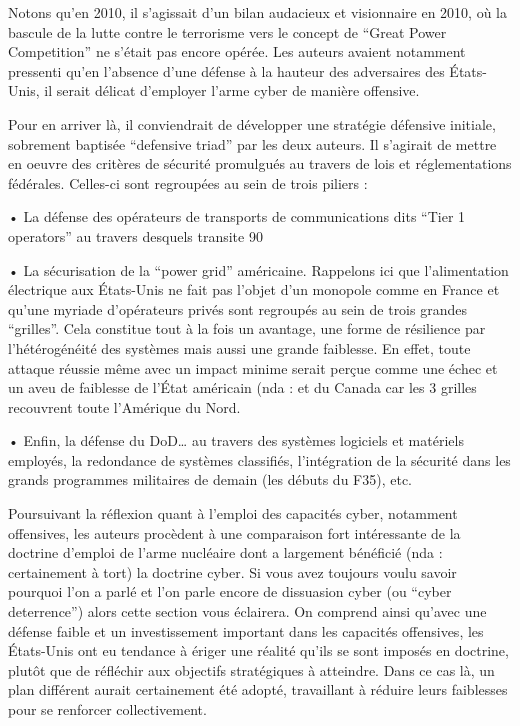 Notons qu’en 2010, il s’agissait d’un bilan audacieux et visionnaire en 2010, où la bascule de la lutte contre le terrorisme vers le concept de “Great Power Competition” ne s’était pas encore opérée. Les auteurs avaient notamment pressenti qu’en l’absence d’une défense à la hauteur des adversaires des États-Unis, il serait délicat d’employer l’arme cyber de manière offensive. 

Pour en arriver là, il conviendrait de développer une stratégie défensive initiale, sobrement baptisée “defensive triad” par les deux auteurs. Il s’agirait de mettre en oeuvre des critères de sécurité promulgués au travers de lois et réglementations fédérales. Celles-ci sont regroupées au sein de trois piliers :

•               La défense des opérateurs de transports de communications dits “Tier 1 operators” au travers desquels transite 90 %

•               La sécurisation de la “power grid” américaine. Rappelons ici que l’alimentation électrique aux États-Unis ne fait pas l’objet d’un monopole comme en France et qu’une myriade d’opérateurs privés sont regroupés au sein de trois grandes “grilles”. Cela constitue tout à la fois un avantage, une forme de résilience par l’hétérogénéité des systèmes mais aussi une grande faiblesse. En effet, toute attaque réussie même avec un impact minime serait perçue comme une échec et un aveu de faiblesse de l’État américain (nda : et du Canada car les 3 grilles recouvrent toute l’Amérique du Nord.

•               Enfin, la défense du DoD… au travers des systèmes logiciels et matériels employés, la redondance de systèmes classifiés, l’intégration de la sécurité dans les grands programmes militaires de demain (les débuts du F35), etc.



Poursuivant la réflexion quant à l’emploi des capacités cyber, notamment offensives, les auteurs procèdent à une comparaison fort intéressante de la doctrine d’emploi de l’arme nucléaire dont a largement bénéficié (nda : certainement à tort) la doctrine cyber. Si vous avez toujours voulu savoir pourquoi l’on a parlé et l’on parle encore de dissuasion cyber (ou “cyber deterrence”) alors cette section vous éclairera. On comprend ainsi qu’avec une défense faible et un investissement important dans les capacités offensives, les États-Unis ont eu tendance à ériger une réalité qu’ils se sont imposés en doctrine, plutôt que de réfléchir aux objectifs stratégiques à atteindre. Dans ce cas là, un plan différent aurait certainement été adopté, travaillant à réduire leurs faiblesses pour se renforcer collectivement.


